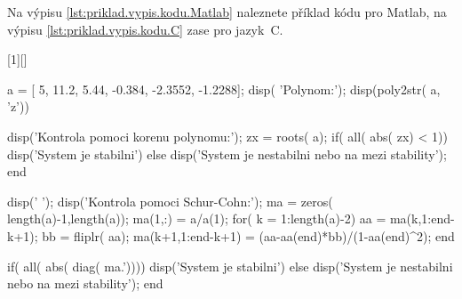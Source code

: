 \clearpage

Na výpisu \ref{lst:priklad.vypis.kodu.Matlab} naleznete příklad kódu pro Matlab, na výpisu \ref{lst:priklad.vypis.kodu.C} zase pro jazyk~C.

[1][]{%
%
%
\lstset{language=Matlab,numbers=left,#1}%
}{%
%
%
}

\begin{matlab}[frame=single,float=htbp,caption={Příklad Schur-Cohnova testu stability v~prostředí Matlab.},label=lst:priklad.vypis.kodu.Matlab,numberstyle=\scriptsize, numbersep=7pt]

a = [ 5, 11.2, 5.44, -0.384, -2.3552, -1.2288];
disp( 'Polynom:'); disp(poly2str( a, 'z'))

disp('Kontrola pomoci korenu polynomu:');
zx = roots( a);
if( all( abs( zx) < 1))
    disp('System je stabilni')
else
    disp('System je nestabilni nebo na mezi stability');
end

disp(' '); disp('Kontrola pomoci Schur-Cohn:');
ma = zeros( length(a)-1,length(a));
ma(1,:) = a/a(1);
for( k = 1:length(a)-2)
    aa = ma(k,1:end-k+1);
    bb = fliplr( aa);
    ma(k+1,1:end-k+1) = (aa-aa(end)*bb)/(1-aa(end)^2);
end

if( all( abs( diag( ma.'))))
    disp('System je stabilni')
else
    disp('System je nestabilni nebo na mezi stability');
end
\end{matlab}

\noindent


